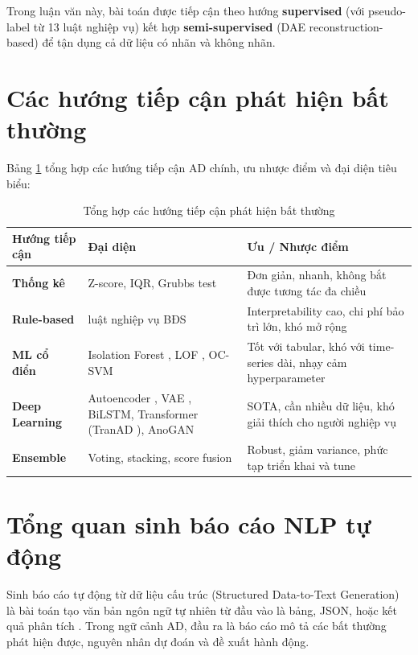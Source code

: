 Trong luận văn này, bài toán được tiếp cận theo hướng \textbf{supervised} (với pseudo-label từ 13 luật nghiệp vụ) kết hợp \textbf{semi-supervised} (DAE reconstruction-based) để tận dụng cả dữ liệu có nhãn và không nhãn.

\section{Các hướng tiếp cận phát hiện bất thường}

Bảng \ref{tab:approaches} tổng hợp các hướng tiếp cận AD chính, ưu nhược điểm và đại diện tiêu biểu:

\begin{table}[h!]
\centering
\fontsize{13pt}{14.95pt}\selectfont
\caption{Tổng hợp các hướng tiếp cận phát hiện bất thường}
\label{tab:approaches}
\begin{tabularx}{\textwidth}{|>{\bfseries}p{2.8cm}|>{\raggedright\arraybackslash}p{3.5cm}|>{\raggedright\arraybackslash}X|}
\hline
\textbf{Hướng tiếp cận} & \textbf{Đại diện} & \textbf{Ưu / Nhược điểm} \\
\hline
Thống kê & Z-score, IQR, Grubbs test & Đơn giản, nhanh, không bắt được tương tác đa chiều \\
\hline
Rule-based & 13 luật nghiệp vụ BĐS & Interpretability cao, chi phí bảo trì lớn, khó mở rộng \\
\hline
ML cổ điển & Isolation Forest \cite{liu2008isolation}, LOF \cite{breunig2000lof}, OC-SVM & Tốt với tabular, khó với time-series dài, nhạy cảm hyperparameter \\
\hline
Deep Learning & Autoencoder \cite{sakurada2014anomaly}, VAE \cite{kingma2014vae}, BiLSTM, Transformer (TranAD \cite{tuli2022tranad}), AnoGAN & SOTA, cần nhiều dữ liệu, khó giải thích cho người nghiệp vụ \\
\hline
Ensemble & Voting, stacking, score fusion & Robust, giảm variance, phức tạp triển khai và tune \\
\hline
\end{tabularx}
\end{table}

\section{Tổng quan sinh báo cáo NLP tự động}

Sinh báo cáo tự động từ dữ liệu cấu trúc (Structured Data-to-Text Generation) là bài toán tạo văn bản ngôn ngữ tự nhiên từ đầu vào là bảng, JSON, hoặc kết quả phân tích \cite{lebret2016neural}. Trong ngữ cảnh AD, đầu ra là báo cáo mô tả các bất thường phát hiện được, nguyên nhân dự đoán và đề xuất hành động.

